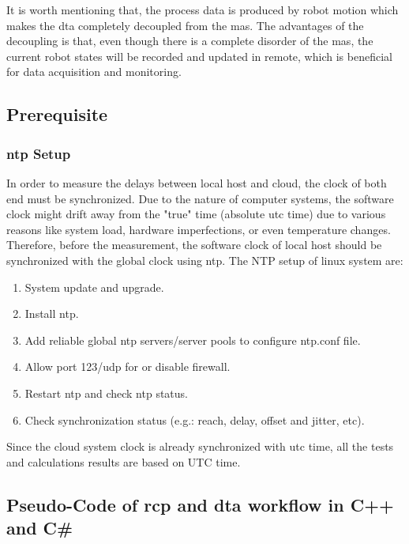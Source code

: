 It is worth mentioning that, the process data is produced by robot motion which makes the \gls{dta} completely decoupled from the \gls{mas}. 
The advantages of the decoupling is that, even though there is a complete disorder of the \gls{mas}, the current robot states will be recorded and updated in remote, 
which is beneficial for data acquisition and monitoring. 



\subsection{Prerequisite}
\subsubsection{\gls{ntp} Setup}
In order to measure the delays between local host and cloud, the clock of both end must be synchronized. 
Due to the nature of computer systems, the software clock might drift away from the "true" time (absolute \gls{utc} time) due to various reasons like system load, hardware imperfections, or even temperature changes.
Therefore, before the measurement, the software clock of local host should be synchronized with the global clock using \gls{ntp}. 
The NTP setup of linux system are:  

\begin{enumerate}
    \item System update and upgrade.
    \item Install \gls{ntp}.
    \item Add reliable global \gls{ntp} servers/server pools to configure ntp.conf file.
    \item Allow port 123/udp for or disable firewall.
    \item Restart \gls{ntp} and check \gls{ntp} status.
    \item Check synchronization status (e.g.: reach, delay, offset and jitter, etc).
    \end{enumerate}

Since the cloud system clock is already synchronized with \gls{utc} time, all the tests and calculations results are based on UTC time. 

\subsection{Pseudo-Code of \gls{rcp} and \gls{dta} workflow in C++ and C\#}

